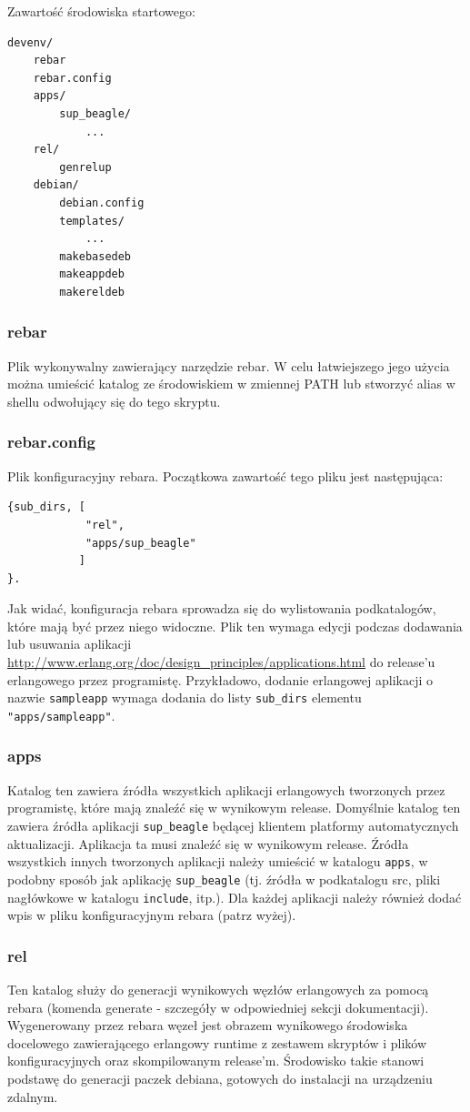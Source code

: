 \documentclass[polish,12pt]{aghthesis}
\begin{document}
Zawartość środowiska startowego:

\begin{verbatim}
devenv/
    rebar
    rebar.config
    apps/
        sup_beagle/
            ...
    rel/
        genrelup
    debian/
        debian.config
        templates/
            ...
        makebasedeb
        makeappdeb
        makereldeb
\end{verbatim}

\subsubsection{rebar}
Plik wykonywalny zawierający narzędzie rebar. W celu łatwiejszego jego użycia można umieścić katalog ze środowiskiem w zmiennej PATH lub stworzyć alias w shellu odwołujący się do tego skryptu.
\subsubsection{rebar.config}
Plik konfiguracyjny rebara. Początkowa zawartość tego pliku jest następująca:
\begin{verbatim}
{sub_dirs, [
            "rel",
            "apps/sup_beagle"
           ]
}.
\end{verbatim}
Jak widać, konfiguracja rebara sprowadza się do wylistowania podkatalogów, które mają być przez niego widoczne. Plik ten wymaga edycji podczas dodawania lub usuwania aplikacji \url{http://www.erlang.org/doc/design_principles/applications.html} do release'u erlangowego przez programistę. Przykładowo, dodanie erlangowej aplikacji o nazwie \texttt{sampleapp} wymaga dodania do listy \texttt{sub\_dirs} elementu \texttt{"apps/sampleapp"}.
\subsubsection{apps}
Katalog ten zawiera źródła wszystkich aplikacji erlangowych tworzonych przez programistę, które mają znaleźć się w wynikowym release. Domyślnie katalog ten zawiera źródła aplikacji \texttt{sup\_beagle} będącej klientem platformy automatycznych aktualizacji. Aplikacja ta musi znaleźć się w wynikowym release. Źródła wszystkich innych tworzonych aplikacji należy umieścić w katalogu \texttt{apps}, w podobny sposób jak aplikację \texttt{sup\_beagle} (tj. źródła w podkatalogu src, pliki nagłówkowe w katalogu \texttt{include}, itp.). Dla każdej aplikacji należy również dodać wpis w pliku konfiguracyjnym rebara (patrz wyżej).
\subsubsection{rel}
Ten katalog służy do generacji wynikowych węzłów erlangowych za pomocą rebara (komenda generate - szczegóły w odpowiedniej sekcji dokumentacji). Wygenerowany przez rebara węzeł jest obrazem wynikowego środowiska docelowego zawierającego erlangowy runtime z zestawem skryptów i plików konfiguracyjnych oraz skompilowanym release'm. Środowisko takie stanowi podstawę do generacji paczek debiana, gotowych do instalacji na urządzeniu zdalnym.
\end{document}
